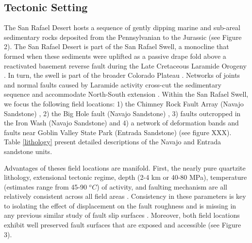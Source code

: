 \documentclass[12pt,a4paper]{article}
\begin{document}
\subsection{Tectonic Setting}

	The San Rafael Desert hosts a sequence of gently dipping marine and sub-areal sedimentary rocks deposited from the Pennsylvanian to the Jurassic (see Figure 2). The San Rafael Desert is part of the San Rafael Swell, a monocline that formed when these sediments were uplifted as a passive drape fold above a reactivated basement reverse fault during the Late Cretaceous Laramide Orogeny \cite{kelley1960fracture, vrolijk2005anatomy}. In turn, the swell is part of the broader Colorado Plateau \cite{kelley1960fracture}. Networks of joints and normal faults caused by Laramide activity cross-cut the sedimentary sequence and accommodate North-South extension \cite{kelley1960fracture, aydin1977faulting}. Within the San Rafael Swell, we focus the following field locations: 1) the Chimney Rock Fault Array (Navajo Sandstone) \cite{krantz1986orthorhombic, maerten2001digital, davatzes2003overprinting}, 2) the Big Hole fault (Navajo Sandstone) \cite{shipton2001damage, shipton2003conceptual}, 3) faults outcropped in the Iron Wash (Navajo Sandstone) \cite{aydin1977faulting, aydin1978development} and 4) a network of deformation bands and faults near Goblin Valley State Park \cite{aydin1977faulting, aydin1978development, fossen1998deformation, fossen2005fault} (Entrada Sandstone) (see figure XXX). Table \ref{lithology} present detailed descriptions of the Navajo and Entrada sandstone units.

	Advantages of theses field locations are manifold. First, the nearly pure quartzite lithology, extensional tectonic regime, depth (2-4 km or 40-80 MPa), temperature (estimates range from 45-90 $^oC$) of activity, and faulting mechanism are all relatively consistent across all field areas \cite{vrolijk2005anatomy}. Consistency in these parameters is key to isolating the effect of displacement on the fault roughness and is missing in any previous similar study of fault slip surfaces \cite{sagy2007evolution, brodsky2011faults}. Moreover, both field locations exhibit well preserved fault surfaces that are exposed and accessible (see Figure 3). 
\end{document}
